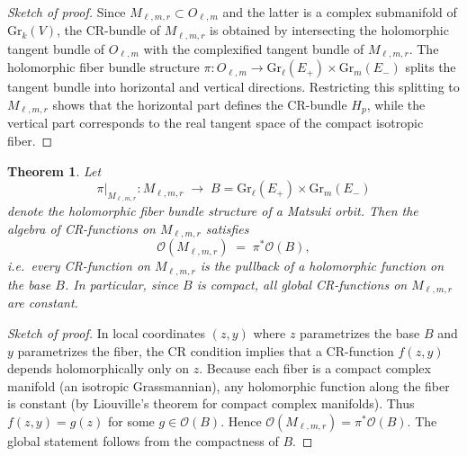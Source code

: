 \documentclass[12pt,a4paper]{article}
\theoremstyle{plain}
\newtheorem{theorem}{Theorem}
\theoremstyle{definition}
\theoremstyle{remark}
\begin{document}
\begin{proof}[Sketch of proof]
Since $M_{\ell,m,r} \subset O_{\ell,m}$ and the latter is a complex submanifold 
of $\mathrm{Gr}_k(V)$, the CR-bundle of $M_{\ell,m,r}$ is obtained by intersecting 
the holomorphic tangent bundle of $O_{\ell,m}$ with the complexified tangent bundle 
of $M_{\ell,m,r}$. 
The holomorphic fiber bundle structure 
$\pi : O_{\ell,m} \to \mathrm{Gr}_\ell(E_+) \times \mathrm{Gr}_m(E_-)$ 
splits the tangent bundle into horizontal and vertical directions. 
Restricting this splitting to $M_{\ell,m,r}$ shows that the horizontal part 
defines the CR-bundle $H_p$, while the vertical part corresponds to the 
real tangent space of the compact isotropic fiber. 
\end{proof}


\begin{theorem}
Let 
\[
\pi|_{M_{\ell,m,r}} : M_{\ell,m,r} \;\longrightarrow\; 
B = \mathrm{Gr}_\ell(E_+) \times \mathrm{Gr}_m(E_-)
\]
denote the holomorphic fiber bundle structure of a Matsuki orbit. 
Then the algebra of CR-functions on $M_{\ell,m,r}$ satisfies
\[
\mathcal{O}(M_{\ell,m,r}) \;=\; \pi^\ast \mathcal{O}(B),
\]
i.e.\ every CR-function on $M_{\ell,m,r}$ is the pullback of a holomorphic 
function on the base $B$. In particular, since $B$ is compact, all 
global CR-functions on $M_{\ell,m,r}$ are constant.
\end{theorem}

\begin{proof}[Sketch of proof]
In local coordinates $(z,y)$ where $z$ parametrizes the base $B$ and 
$y$ parametrizes the fiber, the CR condition implies that a CR-function 
$f(z,y)$ depends holomorphically only on $z$. 
Because each fiber is a compact complex manifold (an isotropic 
Grassmannian), any holomorphic function along the fiber is constant 
(by Liouville’s theorem for compact complex manifolds). 
Thus $f(z,y) = g(z)$ for some $g \in \mathcal{O}(B)$. 
Hence $\mathcal{O}(M_{\ell,m,r}) = \pi^\ast \mathcal{O}(B)$. 
The global statement follows from the compactness of $B$. 
\end{proof}
\end{document}
